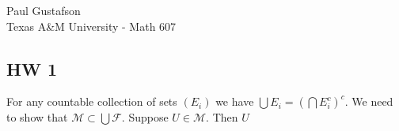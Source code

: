 \documentclass{article}
\begin{document}
\noindent Paul Gustafson\\
\noindent Texas A\&M University - Math 607\\ 

\subsection*{HW 1}
 For any countable collection of sets $(E_i)$ we have $\bigcup E_i = (\bigcap E_i^c)^c$.
 We need to show that $\mathcal M \subset \bigcup \mathcal F$. Suppose $U \in \mathcal M$.  Then $U$
\end{document}
